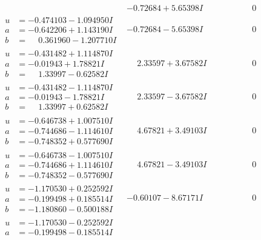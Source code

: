 \documentclass[1p]{elsarticle_modified}
\theoremstyle{definition}
\begin{document}
$$\begin{array}{c|c|c}
 & -0.72684 + 5.65398 I & \phantom{-0.000000 } 0 \\ \hline\begin{aligned}
u &= -0.474103 - 1.094950 I \\
a &= -0.642206 + 1.143190 I \\
b &= \phantom{-}0.361960 - 1.207710 I\end{aligned}
 & -0.72684 - 5.65398 I & \phantom{-0.000000 } 0 \\ \hline\begin{aligned}
u &= -0.431482 + 1.114870 I \\
a &= -0.01943 + 1.78821 I \\
b &= \phantom{-}1.33997 - 0.62582 I\end{aligned}
 & \phantom{-}2.33597 + 3.67582 I & \phantom{-0.000000 } 0 \\ \hline\begin{aligned}
u &= -0.431482 - 1.114870 I \\
a &= -0.01943 - 1.78821 I \\
b &= \phantom{-}1.33997 + 0.62582 I\end{aligned}
 & \phantom{-}2.33597 - 3.67582 I & \phantom{-0.000000 } 0 \\ \hline\begin{aligned}
u &= -0.646738 + 1.007510 I \\
a &= -0.744686 - 1.114610 I \\
b &= -0.748352 + 0.577690 I\end{aligned}
 & \phantom{-}4.67821 + 3.49103 I & \phantom{-0.000000 } 0 \\ \hline\begin{aligned}
u &= -0.646738 - 1.007510 I \\
a &= -0.744686 + 1.114610 I \\
b &= -0.748352 - 0.577690 I\end{aligned}
 & \phantom{-}4.67821 - 3.49103 I & \phantom{-0.000000 } 0 \\ \hline\begin{aligned}
u &= -1.170530 + 0.252592 I \\
a &= -0.199498 + 0.185514 I \\
b &= -1.180860 - 0.500188 I\end{aligned}
 & -0.60107 - 8.67171 I & \phantom{-0.000000 } 0 \\ \hline\begin{aligned}
u &= -1.170530 - 0.252592 I \\
a &= -0.199498 - 0.185514 I \\

\end{aligned}
\end{array}$$
\end{document}
